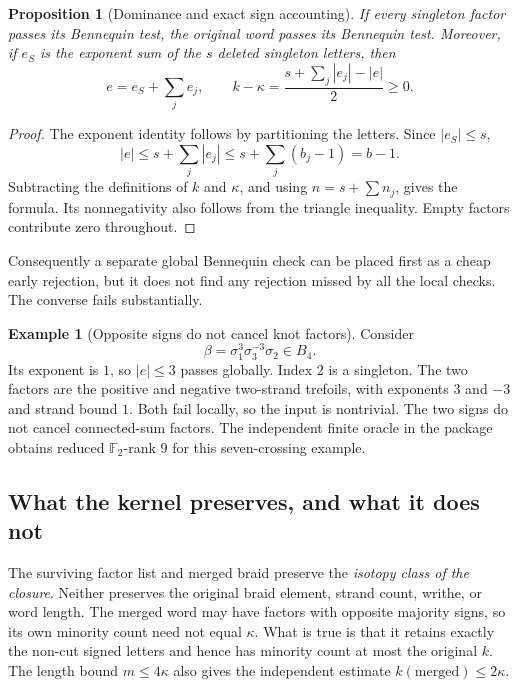 \documentclass[11pt,letterpaper]{article}
\newtheorem{proposition}[theorem]{Proposition}
\theoremstyle{definition}
\newtheorem{example}[theorem]{Example}
\newcommand{\F}{\mathbb F_2}
\begin{document}
\begin{proposition}[Dominance and exact sign accounting]
\label{prop:dominance}
If every singleton factor passes its Bennequin test, the original word passes its Bennequin test. Moreover, if $e_S$ is the exponent sum of the $s$ deleted singleton letters, then
\begin{equation}
 e=e_S+\sum_j e_j,\qquad
 k-\kappa=\frac{s+\sum_j|e_j|-|e|}{2}\ge0.
 \label{eq:signaccount}
\end{equation}
\end{proposition}
\begin{proof}
The exponent identity follows by partitioning the letters. Since $|e_S|\le s$,
\[
 |e|\le s+\sum_j|e_j|\le s+\sum_j(b_j-1)=b-1.
\]
Subtracting the definitions of $k$ and $\kappa$, and using $n=s+\sum n_j$, gives the formula. Its nonnegativity also follows from the triangle inequality. Empty factors contribute zero throughout.
\end{proof}

Consequently a separate global Bennequin check can be placed first as a cheap early rejection, but it does not find any rejection missed by all the local checks. The converse fails substantially.

\begin{example}[Opposite signs do not cancel knot factors]
\label{ex:trefoils}
Consider
\[
 \beta=\sigma_1^3\sigma_3^{-3}\sigma_2\in B_4.
\]
Its exponent is $1$, so $|e|\le3$ passes globally. Index $2$ is a singleton. The two factors are the positive and negative two-strand trefoils, with exponents $3$ and $-3$ and strand bound $1$. Both fail locally, so the input is nontrivial. The two signs do not cancel connected-sum factors. The independent finite oracle in the package obtains reduced $\F$-rank $9$ for this seven-crossing example.
\end{example}

\subsection{What the kernel preserves, and what it does not}
The surviving factor list and merged braid preserve the \emph{isotopy class of the closure}. Neither preserves the original braid element, strand count, writhe, or word length. The merged word may have factors with opposite majority signs, so its own minority count need not equal $\kappa$. What is true is that it retains exactly the non-cut signed letters and hence has minority count at most the original $k$. The length bound $m\le4\kappa$ also gives the independent estimate $k(\text{merged})\le2\kappa$.
\end{document}
